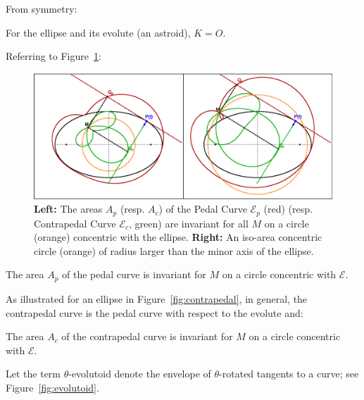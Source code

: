 From symmetry:

\begin{lemma}
For the ellipse and its evolute (an astroid), $K=O$.
\end{lemma}


Referring to Figure~\ref{fig:pedal-contrapedal}:

\begin{figure}
    \centering
    \includegraphics[width=\textwidth]{pics/0020_iso_areas.eps}
    \caption{\textbf{Left:} The areas $A_p$ (resp. $A_c$) of the Pedal Curve $\mathcal{E}_{p}$ (red) (resp. Contrapedal Curve $\mathcal{E}_{c}$, green) are invariant for all $M$ on a circle (orange) concentric with the ellipse. \textbf{Right:} An iso-area concentric circle (orange) of radius larger than the minor axis of the ellipse.}
    \label{fig:pedal-contrapedal}
\end{figure}

\begin{corollary}
The area $A_p$ of the pedal curve is invariant for $M$ on a circle concentric with $\mathcal{E}$.
\end{corollary}

As illustrated for an ellipse in Figure~\ref{fig:contrapedal}, in general, the contrapedal curve is the pedal curve with respect to the evolute \cite[Contrapedal Curve]{mw} and:

\begin{corollary}
The area $A_c$ of the contrapedal curve is invariant for $M$ on a circle concentric with $\mathcal{E}$.
\end{corollary}

Let the term $\theta$-evolutoid denote the envelope of $\theta$-rotated tangents to a curve; see Figure~\ref{fig:evolutoid}.

